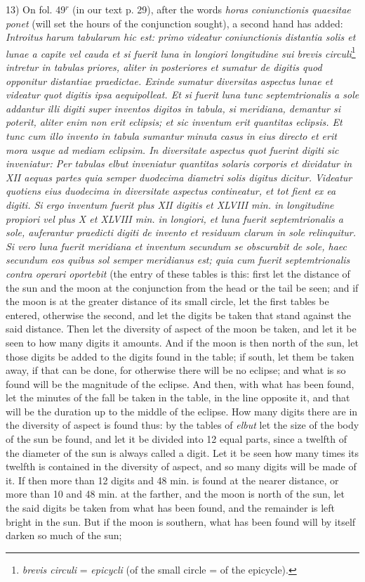 \documentclass[11pt]{article}
\begin{document}
\par 13) On fol. 49$^{r}$ (in our text p. 29), after the words \emph{horas coniunctionis quaesitae ponet} (will set the hours of the conjunction sought), a second hand has added: \emph{Introitus harum tabularum hic est: primo videatur coniunctionis distantia solis et lunae a capite vel cauda et si fuerit luna in longiori longitudine sui brevis circuli}\footnote{\emph{brevis circuli} = \emph{epicycli} (of the small circle = of the epicycle).} \emph{intretur in tabulas priores, aliter in posteriores et sumatur de digitis quod opponitur distantiae praedictae. Exinde sumatur diversitas aspectus lunae et videatur quot digitis ipsa aequipolleat. Et si fuerit luna tunc septemtrionalis a sole addantur illi digiti super inventos digitos in tabula, si meridiana, demantur si poterit, aliter enim non erit eclipsis; et sic inventum erit quantitas eclipsis. Et tunc cum illo invento in tabula sumantur minuta casus in eius directo et erit mora usque ad mediam eclipsim. In diversitate aspectus quot fuerint digiti sic inveniatur: Per tabulas elbut inveniatur quantitas solaris corporis et dividatur in XII aequas partes quia semper duodecima diametri solis digitus dicitur. Videatur quotiens eius duodecima in diversitate aspectus contineatur, et tot fient ex ea digiti. Si ergo inventum fuerit plus XII digitis et XLVIII min. in longitudine propiori vel plus X et XLVIII min. in longiori, et luna fuerit septemtrionalis a sole, auferantur praedicti digiti de invento et residuum clarum in sole relinquitur. Si vero luna fuerit meridiana et inventum secundum se obscurabit de sole, haec secundum eos quibus sol semper meridianus est; quia cum fuerit septemtrionalis contra operari oportebit} (the entry of these tables is this: first let the distance of the sun and the moon at the conjunction from the head or the tail be seen; and if the moon is at the greater distance of its small circle, let the first tables be entered, otherwise the second, and let the digits be taken that stand against the said distance. Then let the diversity of aspect of the moon be taken, and let it be seen to how many digits it amounts. And if the moon is then north of the sun, let those digits be added to the digits found in the table; if south, let them be taken away, if that can be done, for otherwise there will be no eclipse; and what is so found will be the magnitude of the eclipse. And then, with what has been found, let the minutes of the fall be taken in the table, in the line opposite it, and that will be the duration up to the middle of the eclipse. How many digits there are in the diversity of aspect is found thus: by the tables of \emph{elbut} let the size of the body of the sun be found, and let it be divided into 12 equal parts, since a twelfth of the diameter of the sun is always called a digit. Let it be seen how many times its twelfth is contained in the diversity of aspect, and so many digits will be made of it. If then more than 12 digits and 48 min. is found at the nearer distance, or more than 10 and 48 min. at the farther, and the moon is north of the sun, let the said digits be taken from what has been found, and the remainder is left bright in the sun. But if the moon is southern, what has been found will by itself darken so much of the sun; 
\end{document}
